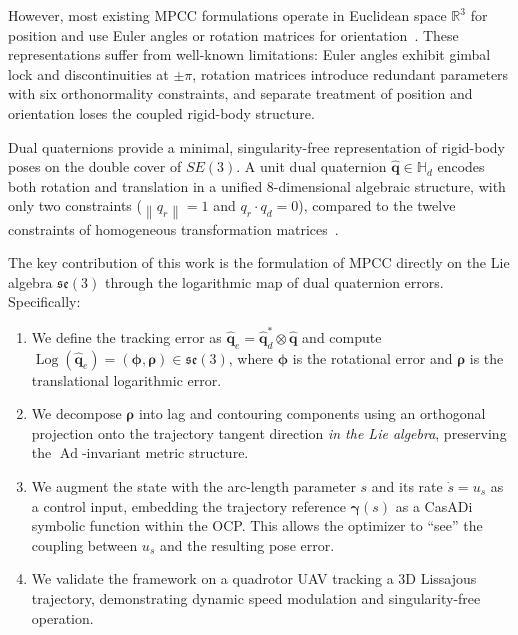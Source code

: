 \documentclass[journal]{IEEEtran}
\newcommand{\dq}{\hat{\bm{q}}}           %
\newcommand{\dqd}{\hat{\bm{q}}_d}        %
\newcommand{\dqe}{\hat{\bm{q}}_e}        %
\newcommand{\se}{\mathfrak{se}(3)}        %
\newcommand{\SE}{SE(3)}                   %
\newcommand{\R}{\mathbb{R}}              %
\newcommand{\Hd}{\mathbb{H}_d}           %
\newcommand{\norm}[1]{\left\| #1 \right\|}
\DeclareMathOperator{\Log}{Log}
\DeclareMathOperator{\Ad}{Ad}
\begin{document}
However, most existing MPCC formulations operate in Euclidean space $\R^3$ for position and use Euler angles or rotation matrices for orientation~\cite{kabzan2019amz, romero2022model}. These representations suffer from well-known limitations: Euler angles exhibit gimbal lock and discontinuities at $\pm\pi$, rotation matrices introduce redundant parameters with six orthonormality constraints, and separate treatment of position and orientation loses the coupled rigid-body structure.

Dual quaternions provide a minimal, singularity-free representation of rigid-body poses on the double cover of $\SE$. A unit dual quaternion $\dq \in \Hd$ encodes both rotation and translation in a unified 8-dimensional algebraic structure, with only two constraints ($\norm{q_r} = 1$ and $q_r \cdot q_d = 0$), compared to the twelve constraints of homogeneous transformation matrices~\cite{wang2012, kenwright2012dual}.

The key contribution of this work is the formulation of MPCC directly on the Lie algebra $\se$ through the logarithmic map of dual quaternion errors. Specifically:

\begin{enumerate}
    \item We define the tracking error as $\dqe = \dqd^* \otimes \dq$ and compute $\Log(\dqe) = (\bm{\phi}, \bm{\rho}) \in \se$, where $\bm{\phi}$ is the rotational error and $\bm{\rho}$ is the translational logarithmic error.
    
    \item We decompose $\bm{\rho}$ into lag and contouring components using an orthogonal projection onto the trajectory tangent direction \emph{in the Lie algebra}, preserving the $\Ad$-invariant metric structure.
    
    \item We augment the state with the arc-length parameter $s$ and its rate $\dot{s} = u_s$ as a control input, embedding the trajectory reference $\bm{\gamma}(s)$ as a CasADi symbolic function within the OCP. This allows the optimizer to ``see'' the coupling between $u_s$ and the resulting pose error.
    
    \item We validate the framework on a quadrotor UAV tracking a 3D Lissajous trajectory, demonstrating dynamic speed modulation and singularity-free operation.
\end{enumerate}

\end{document}
